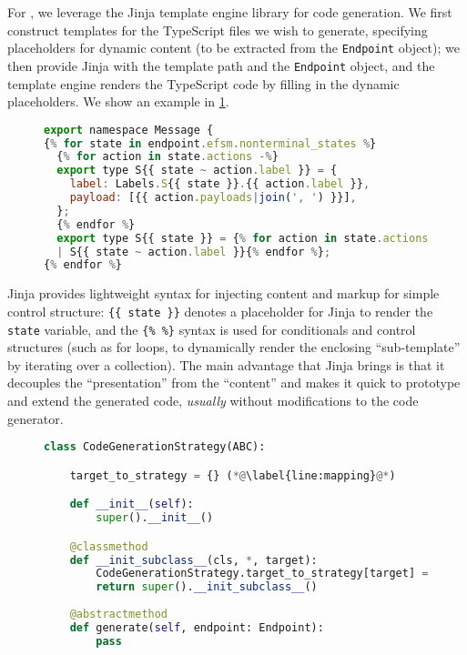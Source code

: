 For , we leverage the Jinja \cite{jinja} 
template engine library for code generation. 
We first construct templates for the TypeScript files we wish to generate,
specifying placeholders for dynamic content (to be extracted
from the \texttt{Endpoint} object); 
we then provide Jinja with the template path and the 
\texttt{Endpoint} object, and the template engine renders the
TypeScript code by filling in the dynamic placeholders. 
We show an example in \cref{lst:jinja}.

\begin{figure}[!ht]
\begin{lstlisting}[language=javascript, title=efsm.ts.j2]
export namespace Message {
{% for state in endpoint.efsm.nonterminal_states %}
  {% for action in state.actions -%}
  export type S{{ state ~ action.label }} = {
    label: Labels.S{{ state }}.{{ action.label }},
    payload: [{{ action.payloads|join(', ') }}],
  };
  {% endfor %}
  export type S{{ state }} = {% for action in state.actions -%}
  | S{{ state ~ action.label }}{% endfor %};
{% endfor %}
\end{lstlisting}
\label{lst:jinja}
\end{figure}

Jinja provides lightweight syntax for injecting content and
markup for simple control structure: \texttt{\{\{ state \}\}} 
denotes a placeholder for Jinja to render the \texttt{state} variable,
and the \texttt{\{\% \%\}} syntax  is used for conditionals and
control structures 
(such as for loops, to dynamically render the enclosing ``sub-template''
by iterating over a collection).
The main advantage that Jinja brings is that 
it decouples the ``presentation''
from the ``content'' and makes it quick to prototype and extend
the generated code, \textit{usually} without modifications to the 
code generator.

\begin{figure}[!ht]
\begin{lstlisting}[language=python]
class CodeGenerationStrategy(ABC):

    target_to_strategy = {} (*@\label{line:mapping}@*)

    def __init__(self):
        super().__init__()

    @classmethod
    def __init_subclass__(cls, *, target):
        CodeGenerationStrategy.target_to_strategy[target] = cls (*@\label{line:registerstrategy}@*)
        return super().__init_subclass__()
    
    @abstractmethod
    def generate(self, endpoint: Endpoint):
        pass
\end{lstlisting}
\label{lst:codegenerationstrategy}
\end{figure}

